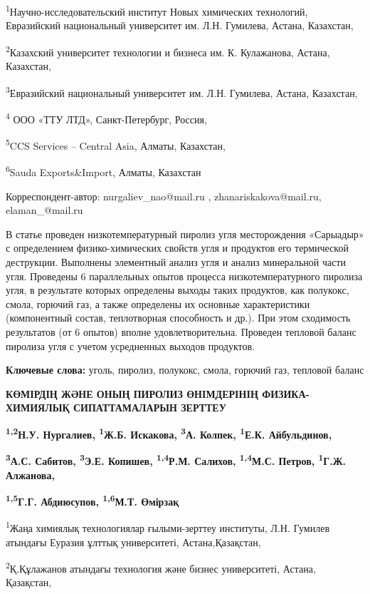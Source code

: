 \textsuperscript{1}Научно-исследовательский институт Новых химических
технологий, Евразийский национальный университет им. Л.Н. Гумилева,
Астана, Казахстан,

\textsuperscript{2}Казахский университет технологии и бизнеса им. К.
Кулажанова, Астана, Казахстан,

\textsuperscript{3}Евразийский национальный университет им. Л.Н.
Гумилева, Астана, Казахстан,

\textsuperscript{4} ООО «ТТУ ЛТД», Санкт-Петербург, Россия,

\textsuperscript{5}CCS Services -- Central Asia, Алматы, Казахстан,

\textsuperscript{6}Sauda Exports\&Import, Алматы, Казахстан

Корреспондент-автор: nurgaliev\_nao@mail.ru , zhanariskakova@mail.ru,
elaman\_@mail.ru

В статье проведен низкотемпературный пиролиз угля месторождения
«Сарыадыр» с определением физико-химических свойств угля и продуктов его
термической деструкции. Выполнены элементный анализ угля и анализ
минеральной части угля. Проведены 6 параллельных опытов процесса
низкотемпературного пиролиза угля, в результате которых определены
выходы таких продуктов, как полукокс, смола, горючий газ, а также
определены их основные характеристики (компонентный состав, теплотворная
способность и др.). При этом сходимость результатов (от 6 опытов) вполне
удовлетворительна. Проведен тепловой баланс пиролиза угля с учетом
усредненных выходов продуктов.

{\bfseries Ключевые слова:} уголь, пиролиз, полукокс, смола, горючий газ,
тепловой баланс

{\bfseries КӨМІРДІҢ ЖӘНЕ ОНЫҢ ПИРОЛИЗ ӨНІМДЕРІНІҢ ФИЗИКА-ХИМИЯЛЫҚ
СИПАТТАМАЛАРЫН ЗЕРТТЕУ}

{\bfseries \textsuperscript{1,2}Н.У. Нургалиев, \textsuperscript{1}Ж.Б.
Искакова, \textsuperscript{3}А. Колпек, \textsuperscript{1}Е.К.
Айбульдинов,}

{\bfseries \textsuperscript{3}А.С. Сабитов, \textsuperscript{3}Э.Е.
Копишев, \textsuperscript{1,4}Р.М. Салихов, \textsuperscript{1,4}М.С.
Петров, \textsuperscript{1}Г.Ж. Алжанова,}

{\bfseries \textsuperscript{1,5}Г.Г. Абдиюсупов, \textsuperscript{1,6}М.Т.
Өмірзақ}

\textsuperscript{1}Жаңа химиялық технологиялар ғылыми-зерттеу институты,
Л.Н. Гумилев атындағы Еуразия ұлттық университеті, Астана,Қазақстан,

\textsuperscript{2}Қ.Құлажанов атындағы технология және бизнес
университеті, Астана, Қазақстан,


